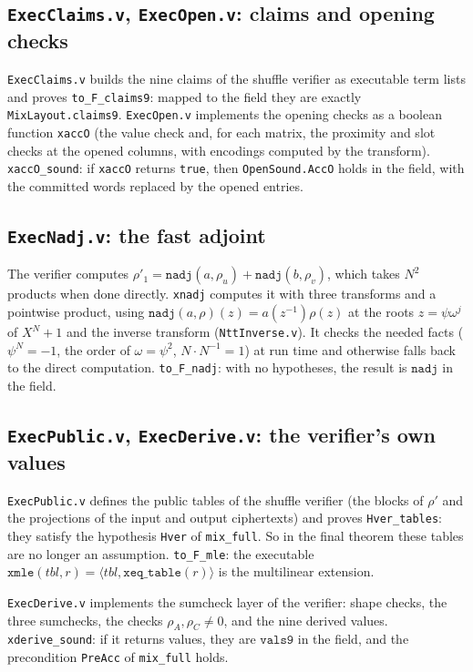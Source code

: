 \documentclass[11pt,a4paper]{article}
\newcommand{\ip}[2]{\langle #1, #2\rangle}
\theoremstyle{definition}
\theoremstyle{plain}
\begin{document}
\subsection{\texttt{ExecClaims.v}, \texttt{ExecOpen.v}: claims and opening checks}

\texttt{ExecClaims.v} builds the nine claims of the shuffle verifier as executable term lists and
proves \texttt{to\_F\_claims9}: mapped to the field they are exactly \texttt{MixLayout.claims9}.
\texttt{ExecOpen.v} implements the opening checks as a boolean function \texttt{xaccO} (the value
check and, for each matrix, the proximity and slot checks at the opened columns, with encodings
computed by the transform). \texttt{xaccO\_sound}: if \texttt{xaccO} returns \texttt{true}, then
\texttt{OpenSound.AccO} holds in the field, with the committed words replaced by the opened entries.

\subsection{\texttt{ExecNadj.v}: the fast adjoint}

The verifier computes $\rho'_1=\mathtt{nadj}(a,\rho_u)+\mathtt{nadj}(b,\rho_v)$, which takes $N^2$
products when done directly. \texttt{xnadj} computes it with three transforms and a pointwise
product, using $\mathtt{nadj}(a,\rho)(z)=a(z^{-1})\rho(z)$ at the roots $z=\psi\omega^j$ of $X^N+1$ and
the inverse transform (\texttt{NttInverse.v}). It checks the needed facts ($\psi^N=-1$, the order of
$\omega=\psi^2$, $N\cdot N^{-1}=1$) at run time and otherwise falls back to the direct computation.
\texttt{to\_F\_nadj}: with no hypotheses, the result is $\mathtt{nadj}$ in the field.

\subsection{\texttt{ExecPublic.v}, \texttt{ExecDerive.v}: the verifier's own values}

\texttt{ExecPublic.v} defines the public tables of the shuffle verifier (the blocks of $\rho'$ and the
projections of the input and output ciphertexts) and proves \texttt{Hver\_tables}: they satisfy the
hypothesis \texttt{Hver} of \texttt{mix\_full}. So in the final theorem these tables are no longer an
assumption. \texttt{to\_F\_mle}: the executable $\mathtt{xmle}(\mathit{tbl},r)=\ip{\mathit{tbl}}{\mathtt{xeq\_table}(r)}$ is
the multilinear extension.

\texttt{ExecDerive.v} implements the sumcheck layer of the verifier: shape checks, the three
sumchecks, the checks $\rho_A,\rho_C\ne0$, and the nine derived values.
\texttt{xderive\_sound}: if it returns values, they are $\mathtt{vals9}$ in the field, and the
precondition \texttt{PreAcc} of \texttt{mix\_full} holds.
\end{document}

